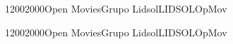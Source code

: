 \documentclass[a4paper,10pt]{report}
\begin{document}
\begin{landscape}
\begin{timetable}
   
   
   
   
   
  {1200}{2000}{Open Movies}{Grupo Lidsol}{{\tiny LIDSOL}}{OpMov}
   
    
   
   
   
   
     {1200}{2000}{Open Movies}{Grupo Lidsol}{{\tiny LIDSOL}}{OpMov}
   
 
  
  
   


 
 
   
     
   
   
   
  
   
  
  
    
   
 \end{timetable}
 \end{landscape}
 
\end{document}
